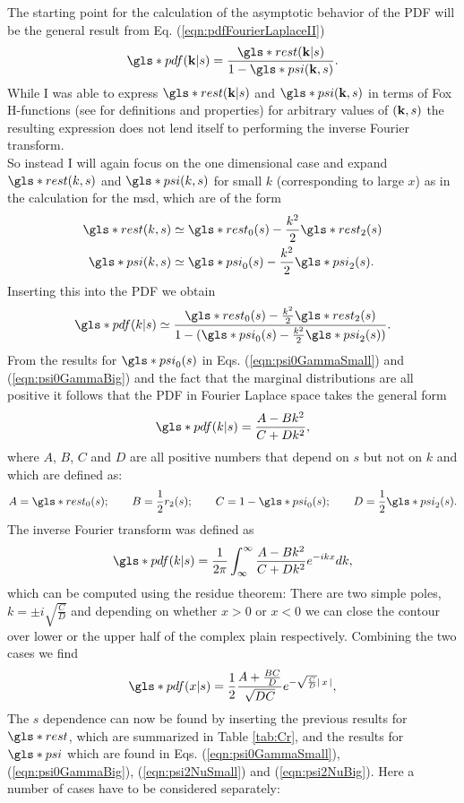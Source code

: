 The starting point for the calculation of the asymptotic behavior of the \gls*{PDF} will be the general result from Eq. (\ref{eqn:pdfFourierLaplaceII})
%
\begin{align}
\gls*{pdf}(\ve{k}|s) = \frac{ \gls*{rest}(\ve{k}|s)}{1 - \gls*{psi}(\ve{k},s)} .
\end{align}
%
While I was able to express $\gls*{rest}(\ve{k}|s)$ and $\gls*{psi}(\ve{k},s)$ in terms of Fox H-functions (see 
\cite{mathai2009} 
for definitions and properties) for arbitrary values of $(\mathbf{ k },s)$ the resulting expression does not lend itself to performing the inverse Fourier transform. \\
So instead I will again focus on the one dimensional case and expand $\gls*{rest}(k,s)$ and $\gls*{psi}(k,s)$ for small $k$ (corresponding to large $x$) as in the calculation for the \gls*{msd}, which are of the form 
%
\begin{align}
\gls*{rest}(k,s) \simeq & \; \gls*{rest}_0(s) - \frac{k^2}{2}  \gls*{rest}_2(s)  \\
\gls*{psi}(k,s) \simeq & \; \gls*{psi}_0(s) - \frac{k^2}{2}  \gls*{psi}_2(s)  .
\end{align}
%
Inserting this into the \gls*{PDF} we obtain
%
\begin{align}
\gls*{pdf}(k|s) \simeq \frac{ \gls*{rest}_0(s) - \frac{k^2}{2}  \gls*{rest}_2(s)}{1 - (\gls*{psi}_0(s) - \frac{k^2}{2}  \gls*{psi}_2(s))} .
\end{align}
%
From the results for $\gls*{psi}_0(s)$ in Eqs. (\ref{eqn:psi0GammaSmall}) and (\ref{eqn:psi0GammaBig}) and the fact that the marginal distributions are all positive it follows that the \gls*{PDF} in Fourier Laplace space takes the general form 
%
\begin{align}
\gls*{pdf}(k|s) = \frac{A- B k^2}{C+D k^2},
\end{align}
%
where $A$, $B$, $C$ and $D$ are all positive numbers that depend on $s$ but not on $k$ and which are defined as:
%
\begin{align}
A = \gls*{rest}_0(s); \qquad B = \frac{1}{2} r_2(s); \qquad C = 1-\gls*{psi}_0(s); \qquad D = \frac{1}{2} \gls*{psi}_2(s) .
\end{align} 
%
The inverse Fourier transform was defined as
%
\begin{align}
\gls*{pdf}(k|s) = \frac{1}{2\pi} \int^{\infty}_{\infty} \frac{A- B k^2}{C+D k^2} e^{-ikx} dk ,
\end{align}
%
which can be computed using the residue theorem: There are two simple poles, $k= \pm i \sqrt{\frac{C}{D}}$ and depending on whether $x > 0$ or $x<0$  we can close the contour over lower or the upper half of the complex plain respectively. Combining the two cases we find 
%
\begin{align}
\gls*{pdf}(x|s) = \frac{1}{2}  \frac{A+ \frac{BC}{D} }{\sqrt{DC}} e^{-\sqrt{\frac{C}{D}} \abs{x}},
\end{align}
%
The $s$ dependence can now be found by inserting the previous results for $\gls*{rest}$, which are summarized in Table \ref{tab:Cr}, and the results for $\gls*{psi}$ which are found in Eqs. (\ref{eqn:psi0GammaSmall}), (\ref{eqn:psi0GammaBig}),  (\ref{eqn:psi2NuSmall}) and (\ref{eqn:psi2NuBig}). Here a number of cases have to be considered separately:

